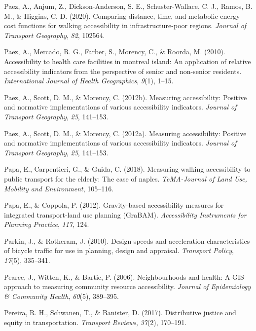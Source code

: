 \documentclass[
11pt, %
oneside, %
english, %
singlespacing, %
]{macthesis} %
\newlength{\cslhangindent}
\newenvironment{CSLReferences}[2] %
 {%
  \setlength{\parindent}{0pt}
  \ifodd #1 \everypar{\setlength{\hangindent}{\cslhangindent}}\ignorespaces\fi
  \ifnum #2 > 0
  \setlength{\parskip}{#2\baselineskip}
  \fi
 }%
 {}
\begin{document}
\begin{CSLReferences}{1}{0}
Paez, A., Anjum, Z., Dickson-Anderson, S. E., Schuster-Wallace, C. J., Ramos, B. M., \& Higgins, C. D. (2020). Comparing distance, time, and metabolic energy cost functions for walking accessibility in infrastructure-poor regions. \emph{Journal of Transport Geography}, \emph{82}, 102564.

Paez, A., Mercado, R. G., Farber, S., Morency, C., \& Roorda, M. (2010). Accessibility to health care facilities in montreal island: An application of relative accessibility indicators from the perspective of senior and non-senior residents. \emph{International Journal of Health Geographics}, \emph{9}(1), 1--15.

Paez, A., Scott, D. M., \& Morency, C. (2012b). Measuring accessibility: Positive and normative implementations of various accessibility indicators. \emph{Journal of Transport Geography}, \emph{25}, 141--153.

Paez, A., Scott, D. M., \& Morency, C. (2012a). Measuring accessibility: Positive and normative implementations of various accessibility indicators. \emph{Journal of Transport Geography}, \emph{25}, 141--153.

Papa, E., Carpentieri, G., \& Guida, C. (2018). Measuring walking accessibility to public transport for the elderly: The case of naples. \emph{TeMA-Journal of Land Use, Mobility and Environment}, 105--116.

Papa, E., \& Coppola, P. (2012). Gravity-based accessibility measures for integrated transport-land use planning (GraBAM). \emph{Accessibility Instruments for Planning Practice}, \emph{117}, 124.

Parkin, J., \& Rotheram, J. (2010). Design speeds and acceleration characteristics of bicycle traffic for use in planning, design and appraisal. \emph{Transport Policy}, \emph{17}(5), 335--341.

Pearce, J., Witten, K., \& Bartie, P. (2006). Neighbourhoods and health: A GIS approach to measuring community resource accessibility. \emph{Journal of Epidemiology \& Community Health}, \emph{60}(5), 389--395.

Pereira, R. H., Schwanen, T., \& Banister, D. (2017). Distributive justice and equity in transportation. \emph{Transport Reviews}, \emph{37}(2), 170--191.


\end{CSLReferences}
\end{document}
